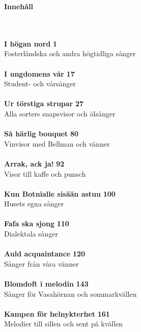 \begin{scriptsize}
\begin{center}
\textbf{Innehåll}
\end{center}
~\\
~\\
\textbf{I högan nord} \dotfill \textbf{1}
~\\
Fosterländska och andra högtidliga sånger
~\\
~\\
\textbf{I ungdomens vår} \dotfill \textbf{17}
~\\
Student- och vårsånger
~\\
~\\
\textbf{Ur törstiga strupar} \dotfill \textbf{27}
~\\
Alla sorters snapsvisor och ölsånger
~\\
~\\
\textbf{Så härlig bouquet} \dotfill \textbf{80}
~\\
Vinvisor med Bellman och vänner
~\\
~\\
\textbf{Arrak, ack ja!} \dotfill \textbf{92}
~\\
Visor till kaffe och punsch
~\\
~\\
\textbf{Kun Botnialle sisään astuu} \dotfill \textbf{100}
~\\
Husets egna sånger
~\\
~\\
\textbf{Fafa ska sjong} \dotfill \textbf{110}
~\\
Dialektala sånger
~\\
~\\
\textbf{Auld acquaintance} \dotfill \textbf{120}
~\\
Sånger från våra vänner
~\\
~\\
\textbf{Blomdoft i melodin} \dotfill \textbf{143}
~\\
Sånger för Vasahörnan och sommarkvällen
~\\
~\\
\textbf{Kampen för helnykterhet} \dotfill \textbf{161}
~\\
Melodier till sillen och sent på kvällen

\end{scriptsize}

\clearpage